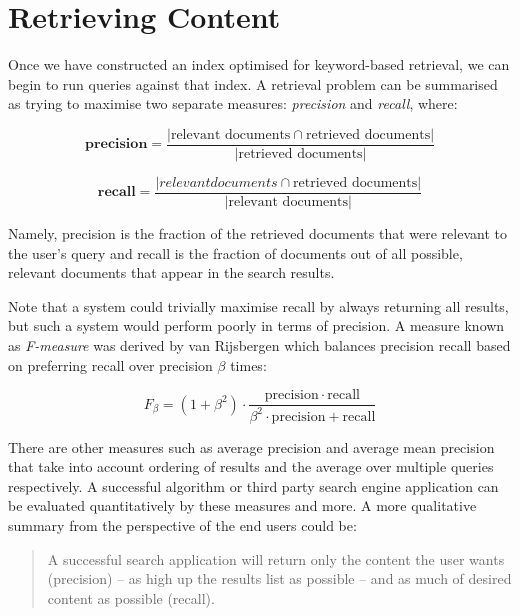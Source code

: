 \section{Retrieving Content}

Once we have constructed an index optimised for keyword-based retrieval,
we can begin to run queries against that index. A retrieval problem
can be summarised as trying to maximise two separate measures: \emph{precision}
and \emph{recall}, where:

\begin{displaymath}
  \textbf{precision} = \frac{
    |\text{relevant documents} \cap \text{retrieved documents}|
  }{
    |\text{retrieved documents}|
  }
\end{displaymath}

\begin{displaymath}
  \textbf{recall} = \frac{
    |{relevant documents} \cap \text{retrieved documents}|
  }{
    |\text{relevant documents}|
  }
\end{displaymath}

Namely, precision is the fraction of the retrieved documents that were
relevant to the user's query and recall is the fraction of documents out of
all possible, relevant documents that appear in the search results.

Note that a system could trivially maximise recall by always returning all
results, but such a system would perform poorly in terms of precision. A
measure known as \emph{F-measure} was derived by van Rijsbergen
\cite{rijsbergen1979information} which
balances precision recall based on preferring recall over precision $\beta$
times:

\begin{displaymath}
  F_\beta = (1 + \beta^2) \cdot \frac{\mathrm{precision} \cdot \mathrm{recall} }{ \beta^2 \cdot \mathrm{precision} + \mathrm{recall}}
\end{displaymath}

There are other measures such as average precision and average mean precision
that take into account ordering of results and the average over multiple
queries respectively. A successful algorithm or third party search engine
application can be evaluated quantitatively by these measures and more. A more
qualitative summary from the perspective of the end users could be:

\begin{quote}
  A successful search application will return only the content the user wants
  (precision) --
  as high up the results list as possible -- and as much of desired content
  as possible (recall).
\end{quote}

